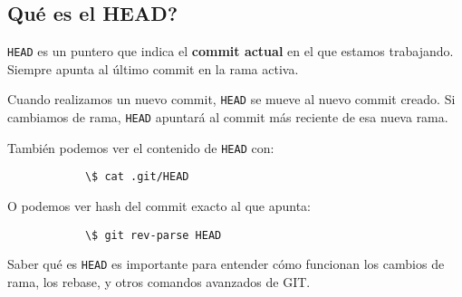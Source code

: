     \subsection{Qu\'e es el HEAD?}
        \texttt{HEAD} es un puntero que indica el \textbf{commit actual} en el que estamos trabajando. Siempre apunta al \'ultimo commit en la rama activa.
        
        Cuando realizamos un nuevo commit, \texttt{HEAD} se mueve al nuevo commit creado. 
        Si cambiamos de rama, \texttt{HEAD} apuntar\'a al commit m\'as reciente de esa nueva rama.

        Tambi\'en podemos ver el contenido de \texttt{HEAD} con:
        \begin{lstlisting}
            \$ cat .git/HEAD
        \end{lstlisting}
        O podemos ver hash del commit exacto al que apunta:
        \begin{lstlisting}
            \$ git rev-parse HEAD
        \end{lstlisting}

        Saber qu\'e es \texttt{HEAD} es importante para entender c\'omo funcionan los cambios de rama, los rebase, y otros comandos avanzados de GIT.